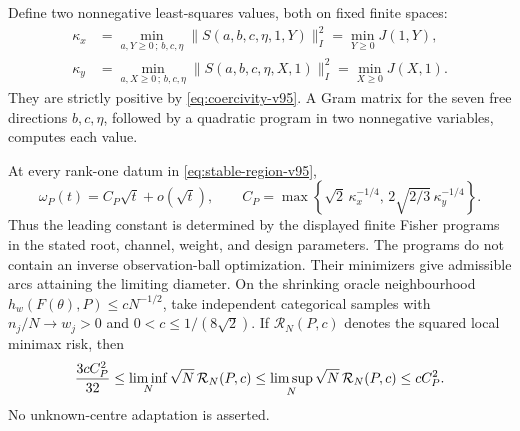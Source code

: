 Define two nonnegative least-squares values, both on fixed finite spaces:
\begin{align}
 \kappa_x&=\min_{a,Y\ge0\,;\,b,c,\eta}
                  \|S(a,b,c,\eta,1,Y)\|_I^2
            =\min_{Y\ge0}J(1,Y),\nonumber\\
 \kappa_y&=\min_{a,X\ge0\,;\,b,c,\eta}
                  \|S(a,b,c,\eta,X,1)\|_I^2
            =\min_{X\ge0}J(X,1).
                  \label{eq:kappa-programs-v95}
\end{align}
They are strictly positive by \eqref{eq:coercivity-v95}. A Gram matrix
for the seven free directions $b,c,\eta$, followed by a quadratic
program in two nonnegative variables, computes each value.

\begin{theorem}\label{thm:cubic-constant-v95}
At every rank-one datum in \eqref{eq:stable-region-v95},
\begin{equation}\label{eq:constant-formula-v95}
 \omega_P(t)=C_P\sqrt t+o(\sqrt t),\qquad
 C_P=\max\left\{\sqrt2\,\kappa_x^{-1/4},\,
                    2\sqrt{2/3}\,\kappa_y^{-1/4}\right\}.
\end{equation}
Thus the leading constant is determined by the displayed finite Fisher
programs in the stated root, channel, weight, and design parameters.
The programs do not contain
an inverse observation-ball optimization. Their minimizers give
admissible arcs attaining the limiting diameter. On the shrinking
oracle neighbourhood $h_w(F(\theta),P)\le cN^{-1/2}$, take independent
categorical samples with $n_j/N\to w_j>0$ and $0<c\le1/(8\sqrt2)$.
If $\mathcal R_N(P,c)$ denotes the squared local minimax risk, then
\begin{equation}\label{eq:risk-constant-v95}
 {3cC_P^2\over32}\le\liminf_N\sqrt N\,\mathcal R_N(P,c)
 \le\limsup_N\sqrt N\,\mathcal R_N(P,c)\le cC_P^2.
\end{equation}
No unknown-centre adaptation is asserted.
\end{theorem}
